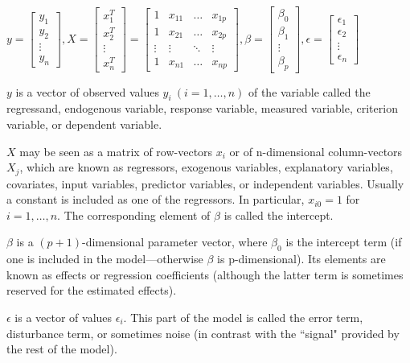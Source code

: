\documentclass{article}
\begin{document}
\(
y = 
\begin{bmatrix}
y_1\\
y_2\\
\vdots\\
y_n
\end{bmatrix}
,
X = 
\begin{bmatrix}
x_1^T\\
x_2^T\\
\vdots\\
x_n^T
\end{bmatrix} = 
\begin{bmatrix}
1 & x_{11} & \dots & x_{1p}\\
1 & x_{21} & \dots & x_{2p}\\
\vdots & \vdots & \ddots & \vdots\\
1 & x_{n1} & \dots & x_{np}
\end{bmatrix}
,
\beta = 
\begin{bmatrix}
\beta_0\\
\beta_1\\
\vdots\\
\beta_p
\end{bmatrix}
,
\epsilon = 
\begin{bmatrix}
\epsilon_1\\
\epsilon_2\\
\vdots\\
\epsilon_n
\end{bmatrix}
\)

\(y\) is a vector of observed values \(y_{i}\ (i=1,\ldots ,n)\) of the variable called the regressand, endogenous variable, response variable, measured variable, criterion variable, or dependent variable.

\(X\) may be seen as a matrix of row-vectors \(x_{i}\) or of n-dimensional column-vectors \(X_{j}\), which are known as regressors, exogenous variables, explanatory variables, covariates, input variables, predictor variables, or independent variables. Usually a constant is included as one of the regressors. In particular, \(x_{i0} = 1\) for \(i = 1, \dots, n\). The corresponding element of \(\beta\) is called the intercept. 

\(\beta\) is a \((p + 1)\)-dimensional parameter vector, where \(\beta_{0}\) is the intercept term (if one is included in the model—otherwise \(\beta\) is p-dimensional). Its elements are known as effects or regression coefficients (although the latter term is sometimes reserved for the estimated effects).

\(\epsilon\) is a vector of values \(\epsilon_{i}\). This part of the model is called the error term, disturbance term, or sometimes noise (in contrast with the ``signal" provided by the rest of the model).
\end{document}
